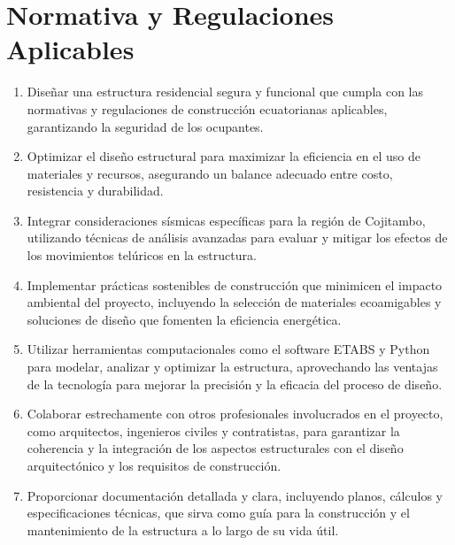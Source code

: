 \documentclass{report}
\begin{document}
\section{Normativa y Regulaciones Aplicables}
\begin{enumerate}
    \item  Diseñar una estructura residencial segura y funcional que cumpla con las normativas y regulaciones de construcción ecuatorianas aplicables, garantizando la seguridad de los ocupantes.

    \item Optimizar el diseño estructural para maximizar la eficiencia en el uso de materiales y recursos, asegurando un balance adecuado entre costo, resistencia y durabilidad.

    \item Integrar consideraciones sísmicas específicas para la región de Cojitambo, utilizando técnicas de análisis avanzadas para evaluar y mitigar los efectos de los movimientos telúricos en la estructura.

    \item Implementar prácticas sostenibles de construcción que minimicen el impacto ambiental del proyecto, incluyendo la selección de materiales ecoamigables y soluciones de diseño que fomenten la eficiencia energética.

    \item Utilizar herramientas computacionales como el software ETABS y Python para modelar, analizar y optimizar la estructura, aprovechando las ventajas de la tecnología para mejorar la precisión y la eficacia del proceso de diseño.

    \item Colaborar estrechamente con otros profesionales involucrados en el proyecto, como arquitectos, ingenieros civiles y contratistas, para garantizar la coherencia y la integración de los aspectos estructurales con el diseño arquitectónico y los requisitos de construcción.

    \item Proporcionar documentación detallada y clara, incluyendo planos, cálculos y especificaciones técnicas, que sirva como guía para la construcción y el mantenimiento de la estructura a lo largo de su vida útil.
\end{enumerate}
\end{document}
